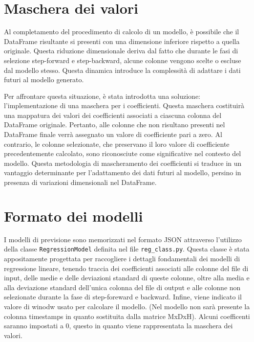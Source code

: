 \documentclass{rapportECL}
\begin{document}
\section{Maschera dei valori}

Al completamento del procedimento di calcolo di un modello, è possibile che il DataFrame risultante si presenti con una dimensione inferiore rispetto
a quella originale. Questa riduzione dimensionale deriva dal fatto che durante le fasi di selezione step-forward e step-backward, alcune colonne vengono 
scelte o escluse dal modello stesso. Questa dinamica introduce la complessità di adattare i dati futuri al modello generato.

Per affrontare questa situazione, è stata introdotta una soluzione: l'implementazione di una maschera per i coefficienti. 
Questa maschera costituirà una mappatura dei valori dei coefficienti associati a ciascuna colonna del DataFrame originale. 
Pertanto, alle colonne che non risultano presenti nel DataFrame finale verrà assegnato un valore di coefficiente pari a zero. Al contrario, le colonne 
selezionate, che preservano il loro valore di coefficiente precedentemente calcolato, sono riconosciute come significative nel contesto del modello. 
Questa metodologia di mascheramento dei coefficienti si traduce in un vantaggio determinante per l'adattamento dei dati futuri al modello, 
persino in presenza di variazioni dimensionali nel DataFrame.

\section{Formato dei modelli}

I modelli di previsione sono memorizzati nel formato JSON attraverso l'utilizzo della classe  \texttt{RegressionModel} definita nel file \texttt{reg\_class.py}.
Questa classe è stata appositamente progettata per raccogliere i dettagli fondamentali dei modelli di regressione lineare, 
tenendo traccia dei coefficienti associati alle colonne del file di input, delle medie e delle deviazioni standard di queste colonne, 
oltre alla media e alla deviazione standard dell'unica colonna del file di output e alle colonne non selezionate durante la fase di step-foreward
e backward. Infine, viene indicato il valore di winodw usato per calcolare il modello.
(Nel modello non sarà presente la colonna timestamps in quanto sostituita dalla matrice MxDxH). Alcuni coefficenti saranno impostati a 0, 
questo in quanto viene rappresentata la maschera dei valori.
\end{document}
